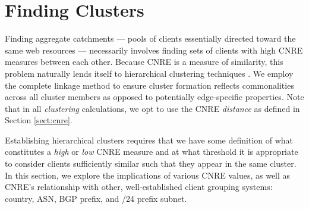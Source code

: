 
\begin{figure*}
    \caption{Dendrogram of CNRE distance across all client pairs}
    \label{fig:dendrogram}
\end{figure*}

\section{Finding Clusters} \label{sect:finding}

Finding aggregate catchments --- pools of clients essentially directed toward
the same web resources --- necessarily involves finding sets of clients with high
CNRE measures between each other. Because CNRE is a measure of similarity, this
problem naturally lends itself to hierarchical clustering techniques \cite{murtagh1983survey}. 
We employ the complete linkage method to ensure cluster formation reflects commonalities
across all cluster members as opposed to potentially edge-specific properties.
Note that in all \emph{clustering} calculations, we opt to use the CNRE \emph{distance}
as defined in Section \ref{sect:cnre}.

Establishing hierarchical clusters requires that we have some definition of what
constitutes a \emph{high} or \emph{low} CNRE measure and at what threshold it is
appropriate to consider clients sufficiently similar such that they appear in
the same cluster. In this section, we explore the implications of various CNRE
values, as well as CNRE's relationship with other, well-established client grouping
systems: country, ASN, BGP prefix, and /24 prefix subnet.




